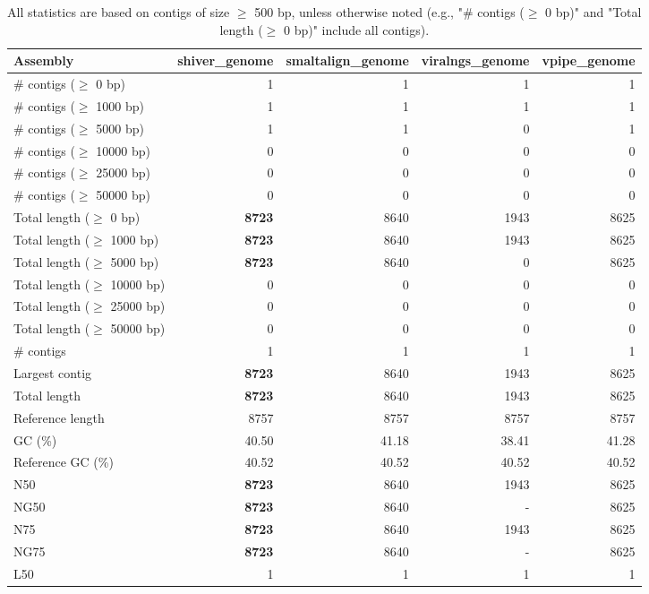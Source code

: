\documentclass[12pt,a4paper]{article}
\begin{document}
\begin{table}[ht]
\begin{center}
\caption{All statistics are based on contigs of size $\geq$ 500 bp, unless otherwise noted (e.g., "\# contigs ($\geq$ 0 bp)" and "Total length ($\geq$ 0 bp)" include all contigs).}
\begin{tabular}{|l*{4}{|r}|}
\hline
Assembly & shiver\_genome & smaltalign\_genome & viralngs\_genome & vpipe\_genome \\ \hline
\# contigs ($\geq$ 0 bp) & 1 & 1 & 1 & 1 \\ \hline
\# contigs ($\geq$ 1000 bp) & 1 & 1 & 1 & 1 \\ \hline
\# contigs ($\geq$ 5000 bp) & 1 & 1 & 0 & 1 \\ \hline
\# contigs ($\geq$ 10000 bp) & 0 & 0 & 0 & 0 \\ \hline
\# contigs ($\geq$ 25000 bp) & 0 & 0 & 0 & 0 \\ \hline
\# contigs ($\geq$ 50000 bp) & 0 & 0 & 0 & 0 \\ \hline
Total length ($\geq$ 0 bp) & {\bf 8723} & 8640 & 1943 & 8625 \\ \hline
Total length ($\geq$ 1000 bp) & {\bf 8723} & 8640 & 1943 & 8625 \\ \hline
Total length ($\geq$ 5000 bp) & {\bf 8723} & 8640 & 0 & 8625 \\ \hline
Total length ($\geq$ 10000 bp) & 0 & 0 & 0 & 0 \\ \hline
Total length ($\geq$ 25000 bp) & 0 & 0 & 0 & 0 \\ \hline
Total length ($\geq$ 50000 bp) & 0 & 0 & 0 & 0 \\ \hline
\# contigs & 1 & 1 & 1 & 1 \\ \hline
Largest contig & {\bf 8723} & 8640 & 1943 & 8625 \\ \hline
Total length & {\bf 8723} & 8640 & 1943 & 8625 \\ \hline
Reference length & 8757 & 8757 & 8757 & 8757 \\ \hline
GC (\%) & 40.50 & 41.18 & 38.41 & 41.28 \\ \hline
Reference GC (\%) & 40.52 & 40.52 & 40.52 & 40.52 \\ \hline
N50 & {\bf 8723} & 8640 & 1943 & 8625 \\ \hline
NG50 & {\bf 8723} & 8640 & - & 8625 \\ \hline
N75 & {\bf 8723} & 8640 & 1943 & 8625 \\ \hline
NG75 & {\bf 8723} & 8640 & - & 8625 \\ \hline
L50 & 1 & 1 & 1 & 1 \\ \hline

\end{tabular}
\end{center}
\end{table}
\end{document}
